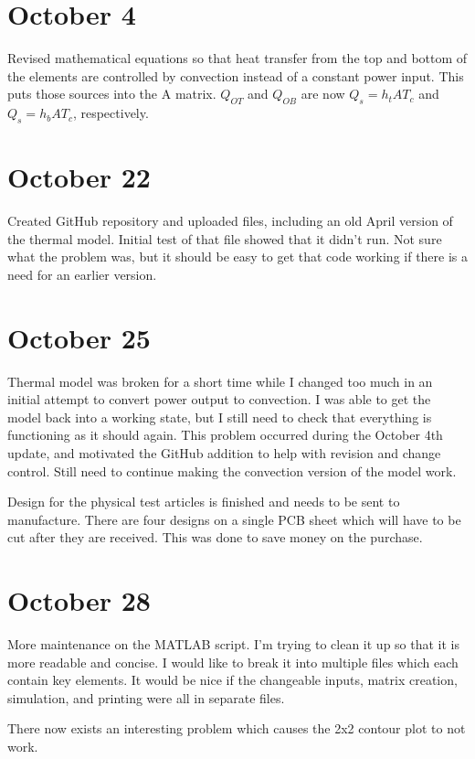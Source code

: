 \documentclass[10pt,twocolumn]{article}
\begin{document}
\section{October 4}
Revised mathematical equations so that heat transfer from the top and bottom of the elements are controlled by convection instead of a constant power input. This puts those sources into the A matrix. $Q_{OT}$ and $Q_{OB}$ are now $Q_{s} = h_{t}AT_{c}$ and $Q_{s} = h_{b}AT_{c}$, respectively.

\section{October 22}
Created GitHub repository and uploaded files, including an old April version of the thermal model. Initial test of that file showed that it didn't run. Not sure what the problem was, but it should be easy to get that code working if there is a need for an earlier version.

\section{October 25}
Thermal model was broken for a short time while I changed too much in an initial attempt to convert power output to convection. I was able to get the model back into a working state, but I still need to check that everything is functioning as it should again. This problem occurred during the October 4th update, and motivated the GitHub addition to help with revision and change control. Still need to continue making the convection version of the model work.

Design for the physical test articles is finished and needs to be sent to manufacture. There are four designs on a single PCB sheet which will have to be cut after they are received. This was done to save money on the purchase.

\section{October 28}
More maintenance on the MATLAB script. I'm trying to clean it up so that it is more readable and concise. I would like to break it into multiple files which each contain key elements. It would be nice if the changeable inputs, matrix creation, simulation, and printing were all in separate files.

There now exists an interesting problem which causes the 2x2 contour plot to not work.
\end{document}
